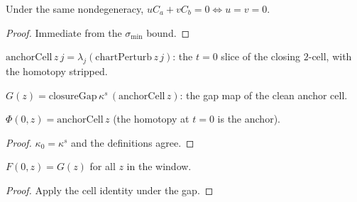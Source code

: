\begin{lemma}
  \label{lem:smul_add_smul_eq_zero_iff}
  Under the same nondegeneracy, $uC_a + vC_b = 0 \iff u = v = 0$.
\end{lemma}
\begin{proof}

\leanok
  Immediate from the $\sigma_{\min}$ bound.
\end{proof}

\begin{definition}\leanok
[clean $t=0$ anchor cell]
  \label{def:anchor_cell}
  $\mathrm{anchorCell}\,z\,j = \lambda_j(\mathrm{chartPerturb}\,z\,j)$: the
  $t = 0$ slice of the closing $2$-cell, with the homotopy stripped.
\end{definition}

\begin{definition}\leanok
[clean $t=0$ anchor gap]
  \label{def:anchor_gap}
  $G(z) = \mathrm{closureGap}\,\kappa^s\,(\mathrm{anchorCell}\,z)$: the gap
  map of the clean anchor cell.
\end{definition}

\begin{lemma}\leanok
[$t=0$ slice of the cell]
  \label{lem:closing_cell_zero_eq_anchor_cell}
  $\Phi(0, z) = \mathrm{anchorCell}\,z$ (the homotopy at $t=0$ is the anchor).
\end{lemma}
\begin{proof}

\leanok
  $\kappa_0 = \kappa^s$ and the definitions agree.
\end{proof}

\begin{lemma}\leanok
[$t=0$ slice of the gap]
  \label{lem:closing_gap_zero_eq_anchor_gap}
  $F(0, z) = G(z)$ for all $z$ in the window.
\end{lemma}
\begin{proof}

\leanok
  Apply the cell identity under the gap.
\end{proof}

